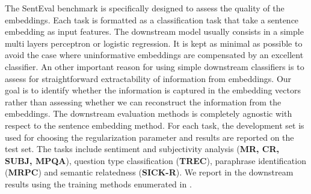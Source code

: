 The SentEval benchmark \parencite{conneau_18} is specifically designed to assess the quality of the embeddings. Each task is formatted as a classification task that take a sentence embedding as input features. The downstream model usually consists in a simple multi layers perceptron or logistic regression. It is kept as minimal as possible to avoid the case where uninformative embeddings are compensated by an excellent classifier. An other important reason for using simple downstream classifiers is to assess for straightforward extractability of information from embeddings. Our goal is to identify whether the information is captured in the embedding vectors rather than assessing whether we can reconstruct the information from the embeddings. The downstream evaluation methods is completely agnostic with respect to the sentence embedding method. For each task, the development set is used for choosing the regularization parameter and results are reported on the test set. The tasks include sentiment and subjectivity analysis (\textbf{MR, CR, SUBJ, MPQA}), question type classification (\textbf{TREC}), paraphrase identification (\textbf{MRPC}) and semantic relatedness (\textbf{SICK-R}). We report in  the downstream results using the training methods enumerated in . 

